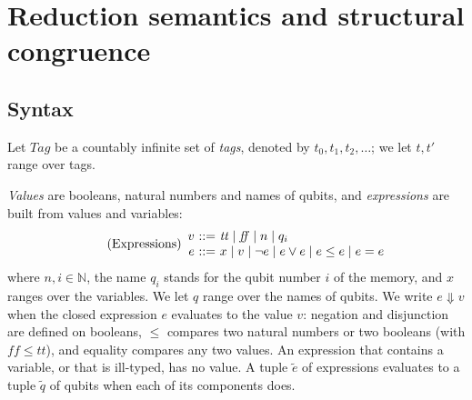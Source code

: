 \section{Reduction semantics and structural congruence}\label{sec:red}

\subsection{Syntax}\label{sec:syntax}

Let $\mathit{Tag}$ be a countably infinite set of \emph{tags}, denoted by
$t_0, t_1, t_2, \ldots$; we let $t, t'$ range over tags.

\emph{Values} are booleans, natural numbers and names of qubits, and
\emph{expressions} are built from values and variables:
\begin{equation}\label{eq:expressions}\tag{Expressions}
\begin{array}{r@{\ ::=\ }l}
v & \mathit{tt} \mid \mathit{ff} \mid n \mid q_i\\
e & x \mid v \mid \neg e \mid e \vee e \mid e \le e \mid e = e
\end{array}
\end{equation}
where $n, i \in \mathbb{N}$, the name $q_i$ stands for the qubit number $i$
of the memory, and $x$ ranges over the variables. We let $q$ range over the
names of qubits. We write $e \Downarrow v$ when the closed expression $e$ evaluates
to the value $v$: negation and disjunction are defined on booleans, $\le$
compares two natural numbers or two booleans (with $\mathit{ff} \le \mathit{tt}$),
and equality compares any two values. An
expression that contains a variable, or that is ill-typed, has no value. A
tuple $\tilde e$ of expressions evaluates to a tuple $\tilde q$ of qubits
when each of its components does.

